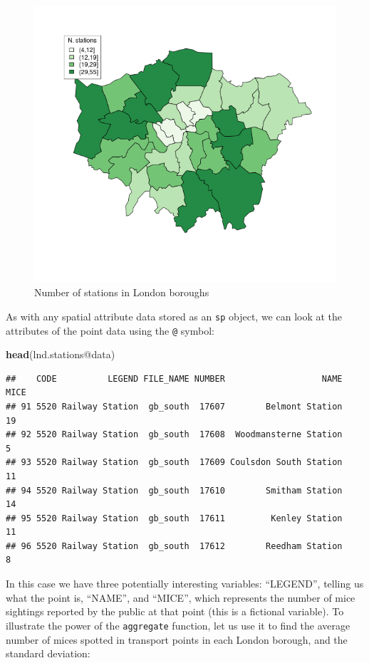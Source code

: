 \documentclass[]{article}
\makeatletter
\newenvironment{Shaded}{}{}
\newcommand{\KeywordTok}[1]{\textcolor[rgb]{0.00,0.44,0.13}{\textbf{{#1}}}}
\newcommand{\NormalTok}[1]{{#1}}
\def\maxwidth{\ifdim\Gin@nat@width>\linewidth\linewidth
\else\Gin@nat@width\fi}
\let\Oldincludegraphics\includegraphics
\renewcommand{\includegraphics}[1]{\Oldincludegraphics[width=\maxwidth]{#1}}
\makeatother
\begin{document}
\begin{figure}[htbp]
\centering
\includegraphics{figure/nStations.png}
\caption{Number of stations in London boroughs}
\end{figure}

As with any spatial attribute data stored as an \texttt{sp} object, we
can look at the attributes of the point data using the \texttt{@}
symbol:

\begin{Shaded}
\begin{Highlighting}[]
\KeywordTok{head}\NormalTok{(lnd.stations@data)}
\end{Highlighting}
\end{Shaded}

\begin{verbatim}
##    CODE          LEGEND FILE_NAME NUMBER                   NAME MICE
## 91 5520 Railway Station  gb_south  17607        Belmont Station   19
## 92 5520 Railway Station  gb_south  17608  Woodmansterne Station    5
## 93 5520 Railway Station  gb_south  17609 Coulsdon South Station   11
## 94 5520 Railway Station  gb_south  17610        Smitham Station   14
## 95 5520 Railway Station  gb_south  17611         Kenley Station   11
## 96 5520 Railway Station  gb_south  17612        Reedham Station    8
\end{verbatim}

In this case we have three potentially interesting variables:
``LEGEND'', telling us what the point is, ``NAME'', and ``MICE'', which
represents the number of mice sightings reported by the public at that
point (this is a fictional variable). To illustrate the power of the
\texttt{aggregate} function, let us use it to find the average number of
mices spotted in transport points in each London borough, and the
standard deviation:
\end{document}
